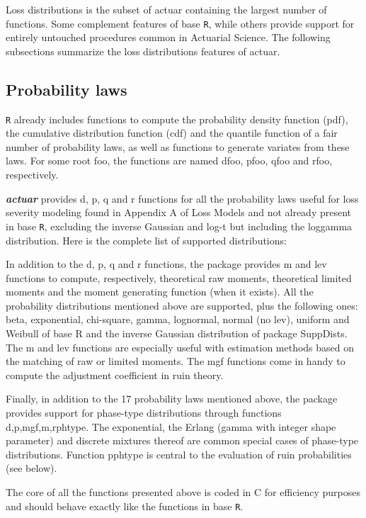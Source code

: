 \documentclass[12pt]{article}
\begin{document}
Loss distributions is the subset of actuar containing the largest number of functions. Some complement features of base \texttt{R}, while others provide support for entirely untouched procedures common in Actuarial Science. The following subsections summarize the loss distributions features of actuar. 

\subsection{Probability laws}

\texttt{R} already includes functions to compute the probability density function (pdf), the cumulative distribution function (cdf) and the quantile function of a fair number of probability laws, as well as functions to generate variates from these laws. For some root foo, the functions are named dfoo, pfoo, qfoo and rfoo, respectively.

\textbf{\textit{actuar}} provides d, p, q and r functions for all the probability laws useful for loss severity modeling found in Appendix A of Loss Models and not already present in base \texttt{R}, excluding the inverse Gaussian and log-t but including the loggamma distribution. Here is the complete list of supported distributions:



In addition to the d, p, q and r functions, the package provides m and lev functions to compute, respectively, theoretical raw moments, theoretical limited moments and the moment generating function (when it exists). All the probability distributions mentioned above are supported, plus the following ones: beta, exponential, chi-square, gamma, lognormal, normal (no lev), uniform and Weibull of base R and the inverse Gaussian distribution of package SuppDists. The m and lev functions are especially useful with estimation methods based on the matching of raw or limited moments. The mgf functions come in handy to compute the adjustment coefficient in ruin theory.

Finally, in addition to the 17 probability laws mentioned above, the package provides support for phase-type distributions through functions {d,p,mgf,m,r}phtype. The exponential, the Erlang (gamma with integer shape parameter) and discrete mixtures thereof are common special cases of phase-type distributions. Function pphtype is central to the evaluation of ruin probabilities (see below).

The core of all the functions presented above is coded in C for efficiency purposes and should behave exactly like the functions in base \texttt{R}.
\end{document}
